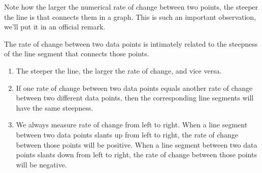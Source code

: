 \documentclass[nooutcomes]{ximera}
\begin{document}
\begin{image}
\end{image}

Note how the larger the numerical rate of change between two points, the steeper the line is that connects them in a graph. This is such an important observation, we'll put it in an official remark.


\begin{remark}
The rate of change between two data points is intimately related to the steepness of the line segment that connects those points.
\begin{enumerate}
\item The steeper the line, the larger the rate of change, and vice versa.
\item If one rate of change between two data points equals another rate of change between two different data points, then the corresponding line segments will have the same steepness.
\item We always measure rate of change from left to right. When a line segment between two data points slants up from left to right, the rate of change between those points will be positive. When a line segment between two data points slants down from left to right, the rate of change between those points will be negative.
\end{enumerate}
\end{remark}
\end{document}
